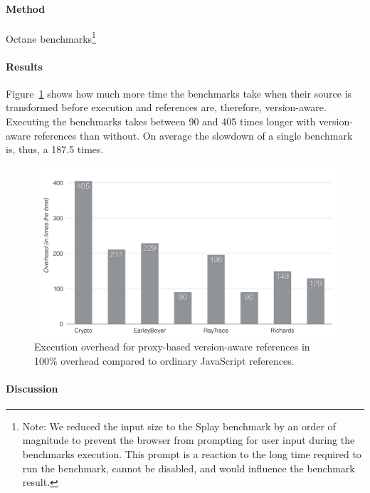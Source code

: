 \paragraph{Method}
Octane benchmarks\footnote{Note: We reduced the input size to the Splay benchmark by an order of magnitude to prevent the browser from prompting for user input during the benchmarks execution. This prompt is a reaction to the long time required to run the benchmark, cannot be disabled, and would influence the benchmark result.}

\paragraph{Results}
Figure~\ref{fig:ExecutionOverhead} shows how much more time the benchmarks take when their source is transformed before execution and references are, therefore, version-aware.
Executing the benchmarks takes between 90 and 405 times longer with version-aware references than without.
On average the slowdown of a single benchmark is, thus, a 187.5 times.

\begin{figure}[h]
    \centering
    \includegraphics[width=\textwidth]{figures/6_evaluation/2_executionOverhead.pdf}
    \caption{Execution overhead for proxy-based version-aware references in 100\% overhead compared to ordinary JavaScript references.}
    \label{fig:ExecutionOverhead}
\end{figure}

\paragraph{Discussion}




